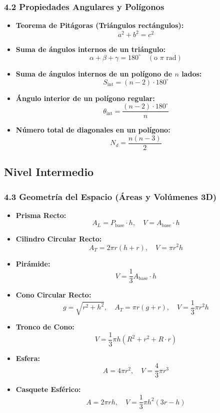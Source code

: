 \documentclass[11pt,a4paper]{article}
\begin{document}
\subsubsection*{4.2 Propiedades Angulares y Polígonos}

\begin{itemize}
  \item \textbf{Teorema de Pitágoras (Triángulos rectángulos):}
  \[
    a^2 + b^2 = c^2
  \]
  \item \textbf{Suma de ángulos internos de un triángulo:}
  \[
    \alpha + \beta + \gamma = 180^\circ \quad (\text{o } \pi\text{ rad})
  \]
  \item \textbf{Suma de ángulos internos de un polígono de $n$ lados:}
  \[
    S_{\text{int}} = (n - 2) \cdot 180^\circ
  \]
  \item \textbf{Ángulo interior de un polígono regular:}
  \[
    \theta_{\text{int}} = \frac{(n - 2) \cdot 180^\circ}{n}
  \]
  \item \textbf{Número total de diagonales en un polígono:}
  \[
    N_d = \frac{n(n - 3)}{2}
  \]
\end{itemize}

\subsection*{Nivel Intermedio}

\subsubsection*{4.3 Geometría del Espacio (Áreas y Volúmenes 3D)}

\begin{itemize}
  \item \textbf{Prisma Recto:}
  \[
    A_L = P_{\text{base}} \cdot h, \quad V = A_{\text{base}} \cdot h
  \]
  \item \textbf{Cilindro Circular Recto:}
  \[
    A_T = 2\pi r(h + r), \quad V = \pi r^2 h
  \]
  \item \textbf{Pirámide:}
  \[
    V = \frac{1}{3} A_{\text{base}} \cdot h
  \]
  \item \textbf{Cono Circular Recto:}
  \[
    g = \sqrt{r^2 + h^2}, \quad A_T = \pi r(g + r), \quad V = \frac{1}{3} \pi r^2 h
  \]
  \item \textbf{Tronco de Cono:}
  \[
    V = \frac{1}{3} \pi h (R^2 + r^2 + R \cdot r)
  \]
  \item \textbf{Esfera:}
  \[
    A = 4\pi r^2, \quad V = \frac{4}{3} \pi r^3
  \]
  \item \textbf{Casquete Esférico:}
  \[
    A = 2\pi r h, \quad V = \frac{1}{3} \pi h^2 (3r - h)
  \]
\end{itemize}
\end{document}
